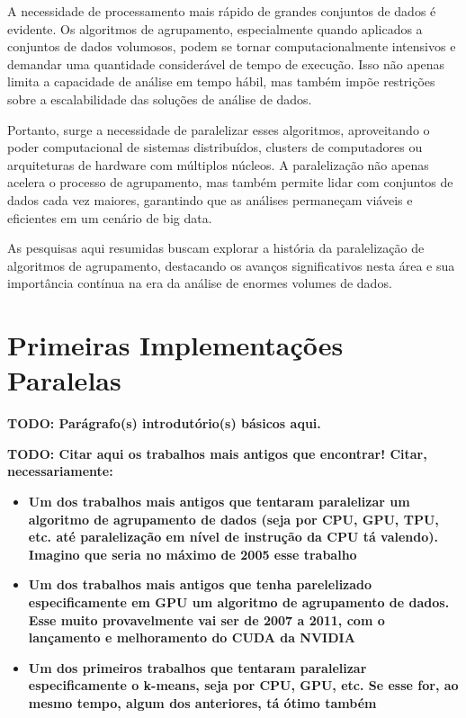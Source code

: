 \documentclass[12pt, %
openright, 
oneside, %
a4paper,    %
brazil]{facom-ufu-abntex2}
\begin{document}
A necessidade de processamento mais rápido de grandes conjuntos de dados é evidente. Os algoritmos de agrupamento, especialmente quando aplicados a conjuntos de dados volumosos, podem se tornar computacionalmente intensivos e demandar uma quantidade considerável de tempo de execução. Isso não apenas limita a capacidade de análise em tempo hábil, mas também impõe restrições sobre a escalabilidade das soluções de análise de dados.

Portanto, surge a necessidade de paralelizar esses algoritmos, aproveitando o poder computacional de sistemas distribuídos, clusters de computadores ou arquiteturas de hardware com múltiplos núcleos. A paralelização não apenas acelera o processo de agrupamento, mas também permite lidar com conjuntos de dados cada vez maiores, garantindo que as análises permaneçam viáveis e eficientes em um cenário de big data.

As pesquisas aqui resumidas buscam explorar a história da paralelização de algoritmos de agrupamento, destacando os avanços significativos nesta área e sua importância contínua na era da análise de enormes volumes de dados.




\section{Primeiras Implementações Paralelas}


\textbf{TODO: Parágrafo(s) introdutório(s) básicos aqui.}

\textbf{TODO: Citar aqui os trabalhos mais antigos que encontrar! Citar, necessariamente:}

\begin{itemize}
  \item \textbf{Um dos trabalhos mais antigos que tentaram paralelizar um algoritmo de agrupamento de dados (seja por CPU, GPU, TPU, etc. até paralelização em nível de instrução da CPU tá valendo). Imagino que seria no máximo de 2005 esse trabalho}
  \item \textbf{Um dos trabalhos mais antigos que tenha parelelizado especificamente em GPU um algoritmo de agrupamento de dados. Esse muito provavelmente vai ser de 2007 a 2011, com o lançamento e melhoramento do CUDA da NVIDIA}
  \item \textbf{Um dos primeiros trabalhos que tentaram paralelizar especificamente o k-means, seja por CPU, GPU, etc. Se esse for, ao mesmo tempo, algum dos anteriores, tá ótimo também}
\end{itemize}
\end{document}
